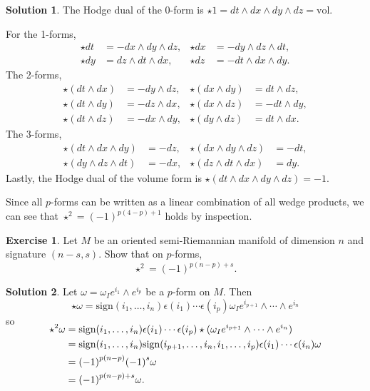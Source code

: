 \documentclass[11pt, a4paper]{article}
\theoremstyle{definition}
\newtheorem{ex}{Exercise}[part]
\newtheorem{sol}{Solution}[part]
\begin{document}
\begin{sol}

The Hodge dual of the 0-form is $\star 1 = dt \wedge dx \wedge dy \wedge dz = \text{vol}$.

For the 1-forms,
\begin{align*}
    \star dt &= - dx \wedge dy \wedge dz, &
    \star dx &= - dy \wedge dz \wedge dt, \\
    \star dy &= dz \wedge dt \wedge dx, &
    \star dz &= - dt \wedge dx \wedge dy.
\end{align*}
The 2-forms,
\begin{align*}
    \star (dt \wedge dx) &= - dy \wedge dz, &
    \star (dx \wedge dy) &= dt \wedge dz, \\
    \star (dt \wedge dy) &= - dz \wedge dx, &
    \star (dx \wedge dz) &= - dt \wedge dy, \\
    \star (dt \wedge dz) &= - dx \wedge dy, &
    \star (dy \wedge dz) &= dt \wedge dx.
\end{align*}
The 3-forms,
\begin{align*}
    \star(dt \wedge dx \wedge dy) &= - dz, &
    \star(dx \wedge dy \wedge dz) &= - dt, \\
    \star(dy \wedge dz \wedge dt) &= - dx, &
    \star(dz \wedge dt \wedge dx) &= dy.
\end{align*}
Lastly, the Hodge dual of the volume form is $\star (dt \wedge dx \wedge dy \wedge dz) = -1$.

Since all $p$-forms can be written as a linear combination of all wedge products, we can see that $\star^2 = {(-1)}^{p (4 - p) + 1}$ holds by inspection.

\end{sol}

\begin{ex}

Let $M$ be an oriented semi-Riemannian manifold of dimension $n$ and signature $(n-s, s)$. Show that on $p$-forms,
\[
    \star^2 = {(-1)}^{p (n - p) + s}.
\]

\end{ex}

\begin{sol}

Let $\omega = \omega_I e^{i_1} \wedge e^{i_p}$ be a $p$-form on $M$. Then
\[
    \star \omega = \text{sign}(i_1, \ldots, i_n) \epsilon(i_1) \cdots \epsilon(i_p) \omega_I e^{i_{p + 1}} \wedge \cdots \wedge e^{i_n}
\]
so
\begin{align*}
    \SwapAboveDisplaySkip
    \star^2 \omega &= \text{sign}(i_1, \ldots, i_n) \epsilon(i_1) \cdots \epsilon(i_p) \star (\omega_I e^{i_{p + 1}} \wedge \cdots \wedge e^{i_n}) \\
        &= \text{sign}(i_1, \ldots, i_n) \text{sign}(i_{p + 1}, \ldots, i_n, i_1, \ldots, i_p) \epsilon(i_1) \cdots \epsilon(i_n) \omega \\
        &= {(-1)}^{p (n - p)} {(-1)}^s \omega \\
        &= {(-1)}^{p (n - p) + s} \omega.
\end{align*}

\end{sol}
\end{document}
